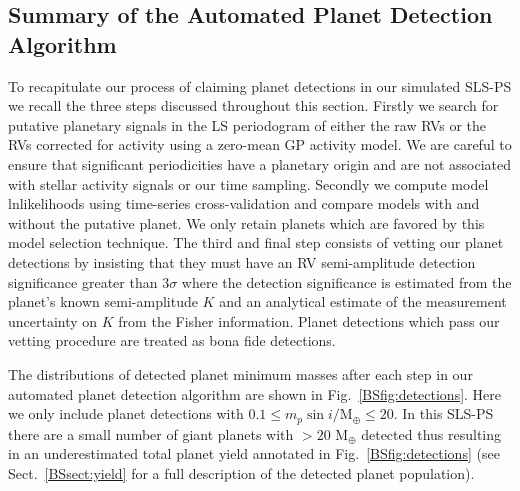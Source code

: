 \subsection{Summary of the Automated Planet Detection Algorithm}
To recapitulate our process of claiming planet detections in our simulated SLS-PS we
recall the three steps discussed throughout this section. Firstly we search for putative
planetary signals in the LS periodogram of either the raw RVs or the RVs corrected for activity using a
zero-mean GP activity model. We are careful to ensure that significant periodicities have a
planetary origin and are not associated with stellar activity signals or our time sampling. Secondly we
compute model lnlikelihoods using time-series cross-validation and compare models with and without the
putative planet. We only retain planets which are favored by this model selection technique. The third and
final step consists of vetting our planet detections by insisting that they must have an RV semi-amplitude
detection significance greater than $3\sigma$ where the detection significance is estimated from the
planet's known semi-amplitude $K$ and an analytical estimate of the measurement uncertainty on $K$ from
the Fisher information. Planet detections which pass our vetting procedure are treated as bona fide
detections.

The distributions of detected planet minimum masses after each step in our automated planet detection
algorithm are shown in Fig.~\ref{BSfig:detections}. Here we only include planet detections with
$0.1 \leq m_p\sin{i}/\text{M}_{\oplus} \leq 20$. In this SLS-PS there are a small number of giant planets
with \msini{} $> 20$ M$_{\oplus}$ detected thus resulting in an underestimated total planet yield annotated
in Fig.~\ref{BSfig:detections} (see Sect.~\ref{BSsect:yield} for a full description of the detected planet
population).

